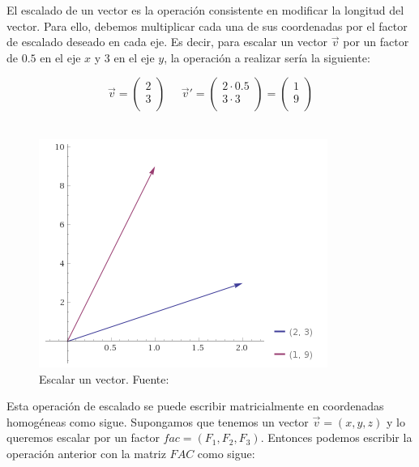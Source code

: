 El escalado de un vector es la operación consistente en modificar la longitud
del vector. Para ello, debemos multiplicar cada una de sus coordenadas por el
factor de escalado deseado en cada eje. Es decir, para escalar un vector
$\overrightarrow{v}$ por un factor de $0.5$ en el eje $x$ y $3$ en el eje $y$,
la operación a realizar sería la siguiente:

\begin{equation}
	\label{eq:scaling}
	\overrightarrow{v} = 
	\left( \begin{array}{c}
			2 \\
			3 \\
	\end{array} \right)
	\;\;\;\;\;
	\overrightarrow{v}' =
	\left( \begin{array}{c}
		2\cdot0.5 \\
		3\cdot3 \\
	\end{array}	\right) =  
	\left( \begin{array}{c}
			1 \\
			9 \\
	\end{array} \right)
\end{equation}\\

\begin{figure}[ht]
	\centering
	\includegraphics{figures/scaling.png}
	\caption[Escalar un vector.]{Escalar un vector. Fuente:~\cite{wolfram}}
	\label{fig:scaling}
\end{figure}

Esta operación de escalado se puede escribir matricialmente en coordenadas
homogéneas como sigue.  Supongamos que tenemos un vector
$\overrightarrow{v}=(x,y,z)$ y lo queremos escalar por un factor
$fac=(F_1,F_2,F_3)$. Entonces podemos escribir la operación anterior con la
matriz $FAC$ como sigue:

